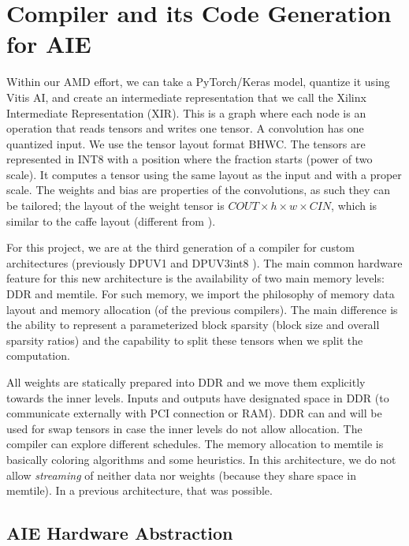 \documentclass[conference]{IEEEtran}
\begin{document}
\section{Compiler and its Code Generation for AIE}
\label{sec:compiler}
Within our AMD effort, we can take a PyTorch/Keras model, quantize it
using Vitis AI, and create an intermediate representation that we call
the Xilinx Intermediate Representation (XIR). This is a graph where
each node is an operation that reads tensors and writes one tensor. A
convolution has one quantized input.  We use the tensor layout format
BHWC. The tensors are represented in INT8 with a position where the
fraction starts (power of two scale). It computes a tensor using the
same layout as the input and with a proper scale. The weights and bias
are properties of the convolutions, as such they can be tailored; the
layout of the weight tensor is $COUT\times h \times w \times CIN$,
which is similar to the caffe layout \cite{Caffe} (different from
\cite{tensorflow}).

For this project, we are at the third generation of a compiler for
custom architectures (previously DPUV1 and DPUV3int8
\cite{10.1145/3473334,abs-2110-04327}). The main common hardware
feature for this new architecture is the availability of two main
memory levels: DDR and memtile. For such memory, we import the
philosophy of memory data layout and memory allocation (of the
previous compilers). The main difference is the ability to represent a
parameterized block sparsity (block size and overall sparsity ratios)
and the capability to split these tensors when we split the
computation.

All weights are statically prepared into DDR and we move them
explicitly towards the inner levels. Inputs and outputs have
designated space in DDR (to communicate externally with PCI connection
or RAM). DDR can and will be used for swap tensors in case the inner
levels do not allow allocation.  The compiler can explore different
schedules. The memory allocation to memtile is basically coloring
algorithms and some heuristics. In this architecture, we do not allow
{\em streaming} of neither data nor weights (because they share space
in memtile). In a previous architecture, that was possible.

\subsection{AIE Hardware Abstraction}

\end{document}
